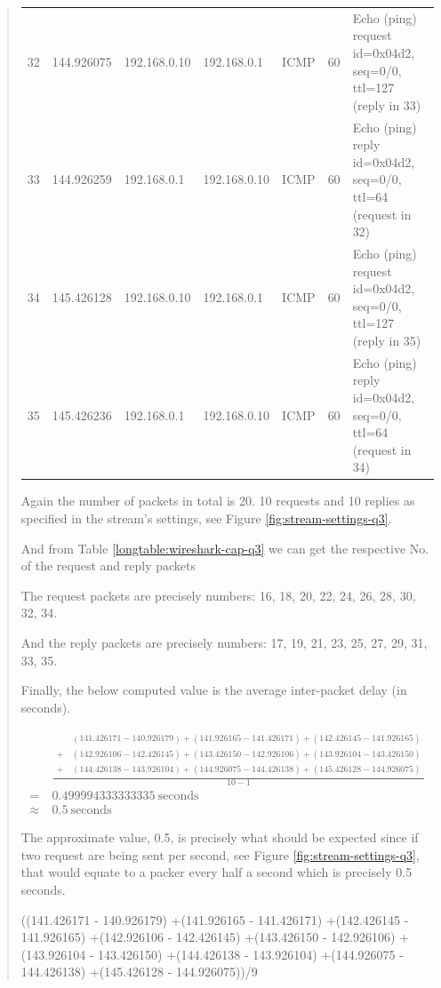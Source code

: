 \documentclass{article}
\newenvironment{ans}
   {\fbox{Answer}\begin{quote}\nopagebreak}
   {\end{quote}}
\newcommand\INFOCOLSIZE{13em}
\begin{document}
\begin{ans}
\begin{center}
\begin{longtable}{|l|l|l|l|l|l|p{\INFOCOLSIZE}|}
32 & 144.926075 & 192.168.0.10 & 192.168.0.1 & ICMP & 60 & Echo (ping)
request id=0x04d2, seq=0/0, ttl=127 (reply in 33) \\
33 & 144.926259 & 192.168.0.1 & 192.168.0.10 & ICMP & 60 & Echo (ping)
reply id=0x04d2, seq=0/0, ttl=64 (request in 32) \\
34 & 145.426128 & 192.168.0.10 & 192.168.0.1 & ICMP & 60 & Echo (ping)
request id=0x04d2, seq=0/0, ttl=127 (reply in 35) \\
35 & 145.426236 & 192.168.0.1 & 192.168.0.10 & ICMP & 60 & Echo (ping)
reply id=0x04d2, seq=0/0, ttl=64 (request in 34) \\
\end{longtable}
\end{center}

Again the number of packets in total is 20. 10 requests and 10
replies as specified in the stream's settings, see Figure
\ref{fig:stream-settings-q3}.

And from Table \ref{longtable:wireshark-cap-q3} we can get the
respective No. of the request and reply packets

The request packets are precisely numbers: 16, 18, 20, 22, 24,
26, 28, 30, 32, 34.

And the reply packets are precisely numbers: 17, 19, 21, 23, 25,
27, 29, 31, 33, 35.

Finally, the below computed value is the average inter-packet
delay (in seconds).

$$
\begin{aligned}
&\frac{
\begin{aligned}
&(141.426171 - 140.926179)
+(141.926165 - 141.426171)
+(142.426145 - 141.926165)\\
+\ &(142.926106 - 142.426145)
+(143.426150 - 142.926106)
+(143.926104 - 143.426150)\\
+\ &(144.426138 - 143.926104)
+(144.926075 - 144.426138)
+(145.426128 - 144.926075)
\end{aligned}
}{10 - 1}\\
=\ & 0.499994333333335\ \text{seconds}\\
\approx\ & 0.5\ \text{seconds}
\end{aligned}
$$

The approximate value, 0.5, is precisely what should be expected
since if two request are being sent per second, see Figure
\ref{fig:stream-settings-q3}, that would equate to a packer
every half a second which is precisely 0.5 seconds.

\newpage

\begin{gruvboxlisting}[language=Python,caption={Python
   expression for calculating the inter-packet delay for
Question 3.}]
((141.426171 - 140.926179)
+(141.926165 - 141.426171)
+(142.426145 - 141.926165)
+(142.926106 - 142.426145)
+(143.426150 - 142.926106)
+(143.926104 - 143.426150)
+(144.426138 - 143.926104)
+(144.926075 - 144.426138)
+(145.426128 - 144.926075))/9
\end{gruvboxlisting}
\end{ans}
\end{document}
